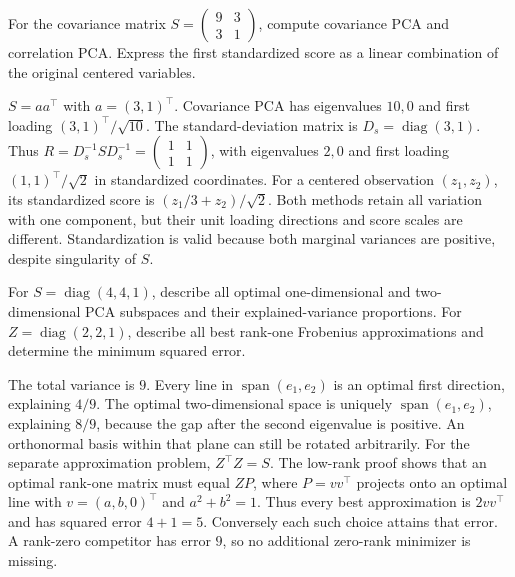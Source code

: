 \begin{problem}\label{ex:12:standardize}
For the covariance matrix $S=\begin{pmatrix}9&3\\3&1\end{pmatrix}$,
compute covariance PCA and correlation PCA. Express the first standardized
score as a linear combination of the original centered variables.
\end{problem}
\begin{solution}
$S=aa^\top$ with $a=(3,1)^\top$.
Covariance PCA has eigenvalues $10,0$ and first loading
$(3,1)^\top/\sqrt{10}$.
The standard-deviation matrix is $D_s=\operatorname{diag}(3,1)$.
Thus $R=D_s^{-1}SD_s^{-1}=\begin{pmatrix}1&1\\1&1\end{pmatrix}$,
with eigenvalues $2,0$ and first loading $(1,1)^\top/\sqrt2$ in
standardized coordinates. For a centered observation $(z_1,z_2)$,
its standardized score is $(z_1/3+z_2)/\sqrt2$.
Both methods retain all variation with one component, but their unit
loading directions and score scales are different. Standardization is
valid because both marginal variances are positive, despite singularity
of $S$.
\end{solution}

\begin{problem}
For $S=\operatorname{diag}(4,4,1)$, describe all optimal one-dimensional
and two-dimensional PCA subspaces and their explained-variance proportions.
For $Z=\operatorname{diag}(2,2,1)$, describe all best rank-one Frobenius
approximations and determine the minimum squared error.
\end{problem}
\begin{solution}
The total variance is $9$. Every line in $\operatorname{span}(e_1,e_2)$
is an optimal first direction, explaining $4/9$. The optimal
two-dimensional space is uniquely $\operatorname{span}(e_1,e_2)$,
explaining $8/9$, because the gap after the second eigenvalue is positive.
An orthonormal basis within that plane can still be rotated arbitrarily.
For the separate approximation problem, $Z^\top Z=S$.
The low-rank proof shows that an optimal rank-one matrix must equal
$ZP$, where $P=vv^\top$ projects onto an optimal line with
$v=(a,b,0)^\top$ and $a^2+b^2=1$.
Thus every best approximation is $2vv^\top$ and has squared error
$4+1=5$. Conversely each such choice attains that error.
A rank-zero competitor has error $9$, so no additional zero-rank
minimizer is missing.
\end{solution}

